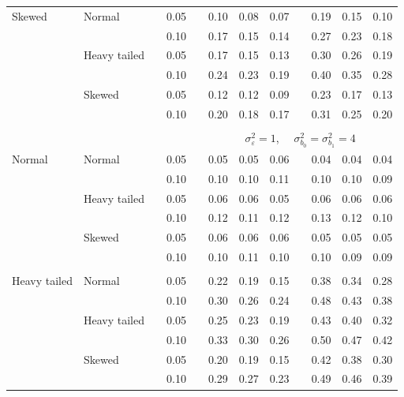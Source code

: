 \documentclass[12pt]{article} %
\begin{document}
\begin{table}[ht]
\begin{scriptsize}
\begin{center}
\begin{tabular}{ll p{.1cm} c p{.1cm} rrr p{.1cm} rrr}
Skewed       & Normal       && 0.05 &&  0.10 & 0.08 & 0.07 && 0.19 & 0.15 & 0.10 \\ 
             &              && 0.10 &&  0.17 & 0.15 & 0.14 && 0.27 & 0.23 & 0.18 \\ 
             & Heavy tailed && 0.05 &&  0.17 & 0.15 & 0.13 && 0.30 & 0.26 & 0.19 \\ 
             &              && 0.10 &&  0.24 & 0.23 & 0.19 && 0.40 & 0.35 & 0.28 \\ 
             & Skewed       && 0.05 &&  0.12 & 0.12 & 0.09 && 0.23 & 0.17 & 0.13 \\ 
             &              && 0.10 &&  0.20 & 0.18 & 0.17 && 0.31 & 0.25 & 0.20 \\ 


&&&&&&&&&&&\\
& && && \multicolumn{7}{c}{$\sigma_{\varepsilon}^2 = 1$, \ \ $\sigma_{b_0}^2 = \sigma_{b_1}^2 = 4$} \\ \cline{6-12}
\rowcolor{gray!20}Normal       & Normal       && 0.05 &&  0.05 & 0.05 & 0.06 && 0.04 & 0.04 & 0.04 \\ 
\rowcolor{gray!20}             &              && 0.10 &&  0.10 & 0.10 & 0.11 && 0.10 & 0.10 & 0.09 \\ 
\rowcolor{gray!20}             & Heavy tailed && 0.05 &&  0.06 & 0.06 & 0.05 && 0.06 & 0.06 & 0.06 \\ 
\rowcolor{gray!20}             &              && 0.10 &&  0.12 & 0.11 & 0.12 && 0.13 & 0.12 & 0.10 \\ 
\rowcolor{gray!20}             & Skewed       && 0.05 &&  0.06 & 0.06 & 0.06 && 0.05 & 0.05 & 0.05 \\ 
\rowcolor{gray!20}             &              && 0.10 &&  0.10 & 0.11 & 0.10 && 0.10 & 0.09 & 0.09 \\ 
 &&&&&&&&&&&\\
Heavy tailed & Normal       && 0.05 &&  0.22 & 0.19 & 0.15 && 0.38 & 0.34 & 0.28 \\ 
             &              && 0.10 &&  0.30 & 0.26 & 0.24 && 0.48 & 0.43 & 0.38 \\ 
             & Heavy tailed && 0.05 &&  0.25 & 0.23 & 0.19 && 0.43 & 0.40 & 0.32 \\ 
             &              && 0.10 &&  0.33 & 0.30 & 0.26 && 0.50 & 0.47 & 0.42 \\ 
             & Skewed       && 0.05 &&  0.20 & 0.19 & 0.15 && 0.42 & 0.38 & 0.30 \\ 
             &              && 0.10 &&  0.29 & 0.27 & 0.23 && 0.49 & 0.46 & 0.39 \\ 

\end{tabular}
\end{center}
\end{scriptsize}
\end{table}
\end{document}
